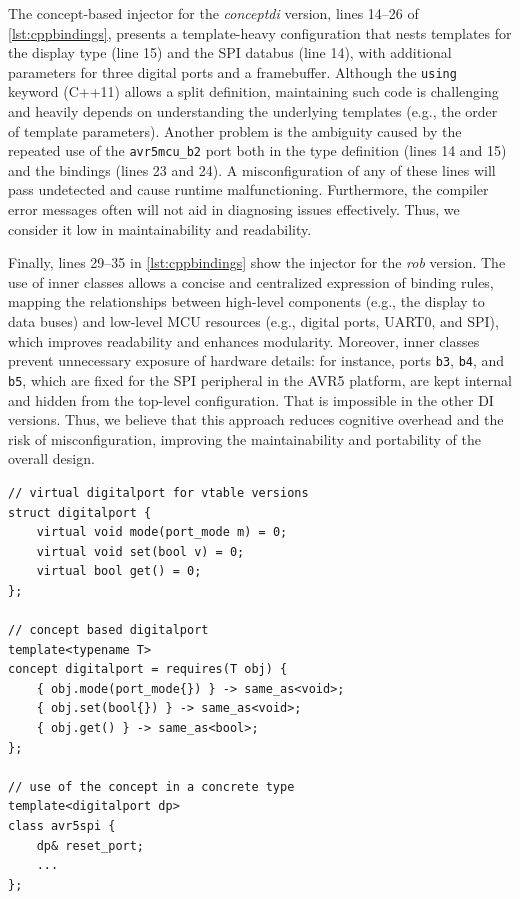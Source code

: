 \documentclass[sigconf]{acmart}
\begin{document}
The concept-based injector for the \emph{conceptdi} version, lines 14--26 of \autoref{lst:cppbindings}, presents a template-heavy configuration that nests templates for the display type (line 15) and the SPI databus (line 14), with additional parameters for three digital ports and a framebuffer. Although the {\tt using} keyword (C++11) allows a split definition, maintaining such code is challenging and heavily depends on understanding the underlying templates (e.g., the order of template parameters). Another problem is the ambiguity caused by the repeated use of the {\tt avr5mcu\_b2} port both in the type definition (lines 14 and 15) and the bindings (lines 23 and 24). A misconfiguration of any of these lines will pass undetected and cause runtime malfunctioning. Furthermore, the compiler error messages often will not aid in diagnosing issues effectively. Thus, we consider it low in maintainability and readability.

Finally, lines 29--35 in \autoref{lst:cppbindings} show the injector for the \emph{rob} version. The use of inner classes allows a concise and centralized expression of binding rules, mapping the relationships between high-level components (e.g., the display to data buses) and low-level MCU resources (e.g., digital ports, UART0, and SPI), which improves readability and enhances modularity. Moreover, inner classes prevent unnecessary exposure of hardware details: for instance, ports {\tt b3}, {\tt b4}, and {\tt b5}, which are fixed for the SPI peripheral in the AVR5 platform, are kept internal and hidden from the top-level configuration. That is impossible in the other DI versions. Thus, we believe that this approach reduces cognitive overhead and the risk of misconfiguration, improving the maintainability and portability of the overall design.

\begin{lstlisting}[float=tp, caption=C++ interface implementation using abstract struct and concepts., label=lst:cppintfsconcept, showlines=true]
// virtual digitalport for vtable versions
struct digitalport {
    virtual void mode(port_mode m) = 0;
    virtual void set(bool v) = 0;
    virtual bool get() = 0;
};

// concept based digitalport
template<typename T>
concept digitalport = requires(T obj) {
    { obj.mode(port_mode{}) } -> same_as<void>;
    { obj.set(bool{}) } -> same_as<void>;
    { obj.get() } -> same_as<bool>;
};

// use of the concept in a concrete type
template<digitalport dp>
class avr5spi {
    dp& reset_port;
    ...
};

\end{lstlisting}
\end{document}
